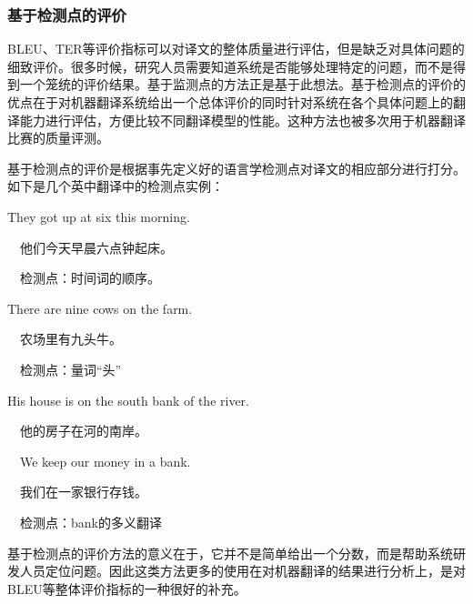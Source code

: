 \subsubsection{基于检测点的评价}

\parinterval  BLEU、TER等评价指标可以对译文的整体质量进行评估，但是缺乏对具体问题的细致评价。很多时候，研究人员需要知道系统是否能够处理特定的问题，而不是得到一个笼统的评价结果。基于监测点的方法正是基于此想法\cite{shiwen1993automatic}。基于检测点的评价的优点在于对机器翻译系统给出一个总体评价的同时针对系统在各个具体问题上的翻译能力进行评估，方便比较不同翻译模型的性能。这种方法也被多次用于机器翻译比赛的质量评测。

\parinterval 基于检测点的评价是根据事先定义好的语言学检测点对译文的相应部分进行打分。如下是几个英中翻译中的检测点实例：

\begin{example}
They got up at six this morning.

\qquad \qquad \ \  他们今天早晨六点钟起床。

\qquad \qquad \ \  检测点：时间词的顺序。
\label{eg:1-3}
\end{example}

\begin{example}
There are nine cows on the farm.

\qquad \qquad \ \  农场里有九头牛。

\qquad \qquad \ \  检测点：量词``头''
\label{eg:1-4}
\end{example}

\begin{example}
His house is on the south bank of the river.

\qquad \qquad \ \  他的房子在河的南岸。

\qquad \qquad \ \  We keep our money in a bank.

\qquad \qquad \ \  我们在一家银行存钱。

\qquad \qquad \ \  检测点：bank的多义翻译
\label{eg:1-5}
\end{example}

\parinterval 基于检测点的评价方法的意义在于，它并不是简单给出一个分数，而是帮助系统研发人员定位问题。因此这类方法更多的使用在对机器翻译的结果进行分析上，是对BLEU等整体评价指标的一种很好的补充。


\sectionnewpage
